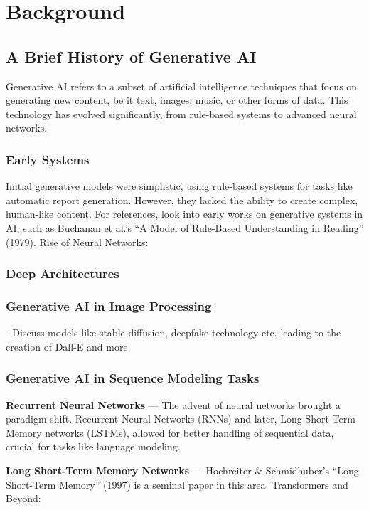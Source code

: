 \documentclass[../main.tex]{subfiles}
\begin{document}
\newpage

\chapter{Background}

\section{A Brief History of Generative AI}
Generative AI refers to a subset of artificial intelligence techniques that focus on generating new content, be it text, images, music, or other forms of data. This technology has evolved significantly, from rule-based systems to advanced neural networks.

\subsection{Early Systems}
Initial generative models were simplistic, using rule-based systems for tasks like automatic report generation. However, they lacked the ability to create complex, human-like content. For references, look into early works on generative systems in AI, such as Buchanan et al.’s “A Model of Rule-Based Understanding in Reading” (1979).
Rise of Neural Networks:

\subsection{Deep Architectures}


\subsection{Generative AI in Image Processing}
- Discuss models like stable diffusion, deepfake technology etc. leading to the creation of Dall-E and more

\subsection{Generative AI in Sequence Modeling Tasks}

\textbf{Recurrent Neural Networks} — The advent of neural networks brought a paradigm shift. Recurrent Neural Networks (RNNs) and later, Long Short-Term Memory networks (LSTMs), allowed for better handling of sequential data, crucial for tasks like language modeling.

\textbf{Long Short-Term Memory Networks} — Hochreiter & Schmidhuber’s “Long Short-Term Memory” (1997) is a seminal paper in this area.
Transformers and Beyond:
\end{document}
